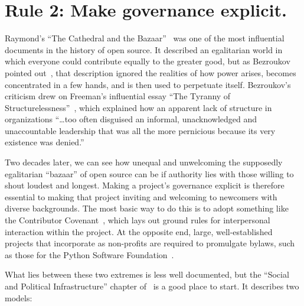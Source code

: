 \documentclass[10pt,letterpaper]{article}
\newcommand{\rulemajor}[1]{\section*{#1}}
\begin{document}
\rulemajor{Rule 2: Make governance explicit.}

Raymond's ``The Cathedral and the Bazaar''~\cite{raymond2001}
was one of the most influential documents in the history of open source.
It described an egalitarian world in which everyone could contribute equally to the greater good,
but as Bezroukov pointed out~\cite{bezroukov1999},
that description ignored the realities of how power arises,
becomes concentrated in a few hands,
and is then used to perpetuate itself.
Bezroukov's criticism drew on Freeman's influential essay ``The Tyranny of Structurelessness''~\cite{freeman1972},
which explained how an apparent lack of structure in organizations ``{\ldots}too often disguised an informal,
unacknowledged and unaccountable leadership that was all the more pernicious because its very existence was denied.''

Two decades later,
we can see how unequal and unwelcoming the supposedly egalitarian ``bazaar'' of open source can be
if authority lies with those willing to shout loudest and longest.
Making a project's governance explicit is therefore essential to making that project inviting and welcoming to newcomers with diverse backgrounds.
The most basic way to do this is to adopt something like the Contributor Covenant~\cite{covenant},
which lays out ground rules for interpersonal interaction within the project.
At the opposite end,
large, well-established projects that incorporate as non-profits are required to promulgate bylaws,
such as those for the Python Software Foundation~\cite{psf-bylaws}.

What lies between these two extremes is less well documented,
but the ``Social and Political Infrastructure'' chapter of~\cite{fogel2005} is a good place to start.
It describes two models:
\end{document}
